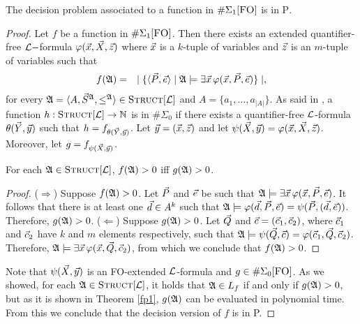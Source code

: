 \begin{theo} \label{decisionptime}
The decision problem associated to a function in $\E1$ is in \textsc{P}.
\end{theo}
\begin{proof}
Let $f$ be a function in $\E1$. Then there exists an extended quantifier-free $\L-$formula $\varphi(\x,\X,\z)$ where $\x$ is a $k$-tuple of variables and $\z$ is an $m$-tuple of variables such that
\begin{eqnarray*}
f(\A) &=& \mid \{ \langle\P,\e\rangle \mid \A \models \exists \x \, \varphi(\x,\P,\e) \} \mid,
\end{eqnarray*}
for every $\A = \langle A, \S^{\A}, \leq^{\A} \rangle \in \Truc$ and $A = \{a_1,\ldots,a_{\vert A \vert}\}$. As said in \cite{DBLP:journals/jcss/SalujaST95}, a function $h:\Truc \to \N$ is in $\#\Sigma_0$ if there exists a quantifier-free $\L$-formula $\theta(\Y,\y)$ such that $h = f_{\theta(\Y,\y)}$. Let $\y = (\x,\z)$ and let $\psi(\X,\y) = \varphi(\x,\X,\z)$. Moreover, let $g = f_{\psi(\X,\y)}$.
\begin{claim}
For each $\A \in \Truc$, $f(\A) > 0$ iff $g(\A) > 0$.
\end{claim}
\begin{proof}
($\Rightarrow$) Suppose $f(\A) > 0$. Let $\P$ and $\e$ be such that $\A \models \exists \x \, \varphi(\x,\P,\e)$. It follows that there is at least one $\d \in A^k$ such that $\A \models \varphi(\d,\P,\e) = \psi(\P,(\d,\e))$. Therefore, $g(\A) > 0$. ($\Leftarrow$) Suppose $g(\A) > 0$. Let $\Q$ and $\c = (\c_1,\c_2)$, where $\c_1$ and $\c_2$ have $k$ and $m$ elements respectively, such that $\A \models \psi(\Q,\c) = \varphi(\c_1,\Q,\c_2)$. Therefore, $\A \models \exists \x \, \varphi(\x,\Q,\c_2)$, from which we conclude that $f(\A) > 0$.
\end{proof}
Note that $\psi(\X,\y)$ is an {\sc FO}-extended $\L$-formula and $g \in\Eo$. As we showed, for each $\A \in \Truc$, it holds that $\A \in L_f$ if and only if $g(\A) > 0$, but as it is shown in Theorem \ref{fp1}, $g(\A)$ can be evaluated in polynomial time. From this we conclude that the decision version of $f$ is in {\sc P}.
\end{proof}